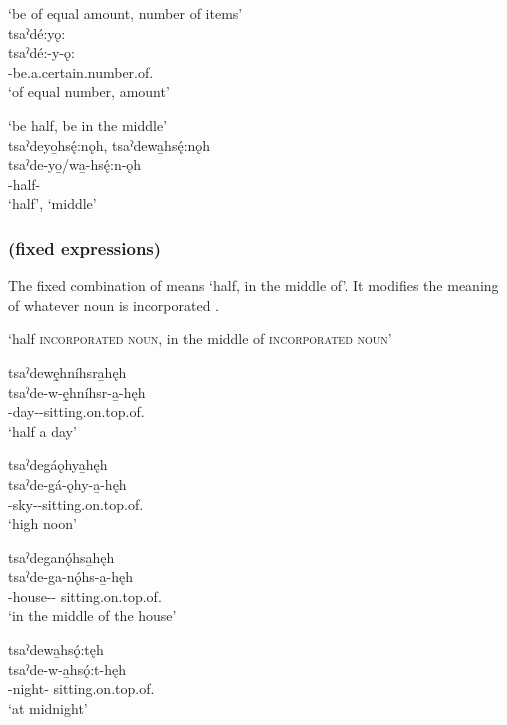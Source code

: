 \ea\label{ex:pppexpressionex31}  ‘be of equal amount, number of items’\\
tsaˀdé:yǫ:\\
\gll tsaˀdé:-y-ǫ:\\
{\coincidentdualic}-be.a.certain.number.of.{\stative}\\
\glt `of equal number, amount'
\z


\ea\label{ex:pppexpressionex21}  ‘be half, be in the middle’\\
tsaˀdeyo̱hsę́:nǫh, tsaˀdewa̱hsę́:nǫh \\
\gll tsaˀde-yo̱/wa̱-hsę́:n-ǫh\\
{\coincidentdualic}-half-{\stative}\\
\glt ‘half’, `middle'
\z


\subsubsection*{ (fixed expressions)} \label{[tsaˀde-incorporated noun-verb]}
The fixed combination of  means ‘half, in the middle of’. It modifies the meaning of whatever noun is incorporated .

\ea\label{ex:pppexpressionex22}  ‘half \textsc{incorporated noun}, in the middle of \textsc{incorporated noun}’

\ea tsaˀdewę̱hníhsra̱hęh\\
\gll tsaˀde-w-ę̱hníhsr-a̱-hęh\\
{\coincidentdualic}-day-{\joinerA}-sitting.on.top.of.{\stative}\\
\glt `half a day'

\ex tsaˀdegáǫhya̱hęh\\
\gll tsaˀde-gá-ǫhy-a̱-hęh\\
{\coincidentdualic}-sky-{\joinerA}-sitting.on.top.of.{\stative}\\
\glt `high noon'

\ex tsaˀdeganǫ́hsa̱hęh\\
\gll tsaˀde-ga-nǫ́hs-a̱-hęh\\
{\coincidentdualic}-house-{\joinerA}- sitting.on.top.of.{\stative}\\
\glt `in the middle of the house'

\ex tsaˀdewa̱hsǫ́:tęh\\
\gll tsaˀde-w-a̱hsǫ́:t-hęh\\
{\coincidentdualic}-night- sitting.on.top.of.{\stative}\\
\glt `at midnight'
\z
\z


